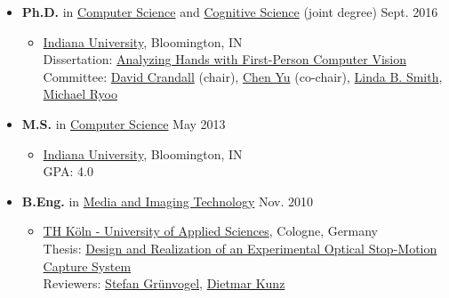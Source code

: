 \documentclass[10pt]{article}
\newenvironment{outerlist}[1][\enskip\textbullet]%
        {\begin{itemize}[#1,leftmargin=*,parsep=5pt,itemsep=0pt,topsep=0pt,partopsep=0pt]}{\end{itemize}%
         \vspace{-.6\baselineskip}}
\newenvironment{innerlist}[1][\enskip\textbullet]%
        {\begin{itemize}[#1,leftmargin=*,parsep=0pt,itemsep=3pt,topsep=-2pt,partopsep=0pt]}
        {\end{itemize}}
\begin{document}
\begin{outerlist}

    \item \textbf{Ph.D.} in \href{https://www.sice.indiana.edu/computer-science/}{Computer Science} and \href{http://www.cogs.indiana.edu/} {Cognitive Science} (joint degree) \hfill Sept. 2016

    \begin{innerlist}
        \item[] \href{http://www.iub.edu}{Indiana University}, Bloomington, IN\\
        Dissertation: \href{http://homes.sice.indiana.edu/sbambach/papers/dissertation/bambach_dissertation_2016.pdf}{Analyzing Hands with First-Person Computer Vision}\\
        Committee: \href{http://homes.sice.indiana.edu/djcran/}{David Crandall} (chair),
        \href{http://psych.indiana.edu/faculty/chenyu.php}{Chen Yu} (co-chair),
        \href{http://psych.indiana.edu/faculty/smith4.php}{Linda B. Smith},
        \href{http://michaelryoo.com/}{Michael Ryoo}
    \end{innerlist}

    \item \textbf{M.S.} in \href{https://www.sice.indiana.edu/computer-science/}{Computer Science} \hfill May 2013

    \begin{innerlist}
        \item[] \href{http://www.iub.edu}{Indiana University}, Bloomington, IN\\
        GPA: 4.0
    \end{innerlist}

    \item \textbf{B.Eng.} in \href{http://www.f07.fh-koeln.de/einrichtungen/imp/institut/overview/}{Media and Imaging Technology} \hfill Nov. 2010

    \begin{innerlist}
        \item[] \href{https://www.th-koeln.de/en/homepage_26.php}{TH K{\"o}ln - University of Applied Sciences}, Cologne, Germany\\
        Thesis: \href{http://opus.bibl.fh-koeln.de/volltexte/2011/298/pdf/Bambach_Sven.pdf}{Design and Realization of an Experimental Optical Stop-Motion Capture System}\\
        Reviewers: \href{https://www.th-koeln.de/personen/stefan.gruenvogel/}{Stefan Gr{\"u}nvogel}, \href{https://www.th-koeln.de/personen/dietmar.kunz/}{Dietmar Kunz}
    \end{innerlist}

\end{outerlist}
\end{document}
